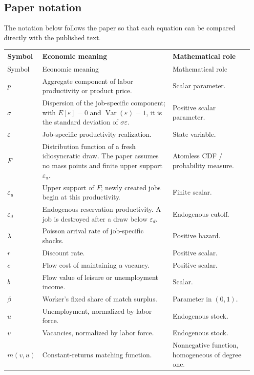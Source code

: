 \documentclass[11pt]{article}
\newcommand{\epsd}{\varepsilon_d}
\newcommand{\epsu}{\varepsilon_u}
\begin{document}
\subsection{Paper notation}
The notation below follows the paper so that each equation can be compared directly with the published text.

\begin{longtable}{>{\raggedright\arraybackslash}p{} >{\raggedright\arraybackslash}p{} >{\raggedright\arraybackslash}p{}}
\toprule
Symbol & Economic meaning & Mathematical role \\
\midrule
\endfirsthead
\toprule
Symbol & Economic meaning & Mathematical role \\
\midrule
\endhead
$p$ & Aggregate component of labor productivity or product price. & Scalar parameter. \\
$\sigma$ & Dispersion of the job-specific component; with $E[\varepsilon]=0$ and $\operatorname{Var}(\varepsilon)=1$, it is the standard deviation of $\sigma\varepsilon$. & Positive scalar parameter. \\
$\varepsilon$ & Job-specific productivity realization. & State variable. \\
$F$ & Distribution function of a fresh idiosyncratic draw. The paper assumes no mass points and finite upper support $\epsu$. & Atomless CDF / probability measure. \\
$\epsu$ & Upper support of $F$; newly created jobs begin at this productivity. & Finite scalar. \\
$\epsd$ & Endogenous reservation productivity. A job is destroyed after a draw below $\epsd$. & Endogenous cutoff. \\
$\lambda$ & Poisson arrival rate of job-specific shocks. & Positive hazard. \\
$r$ & Discount rate. & Positive scalar. \\
$c$ & Flow cost of maintaining a vacancy. & Positive scalar. \\
$b$ & Flow value of leisure or unemployment income. & Scalar. \\
$\beta$ & Worker's fixed share of match surplus. & Parameter in $(0,1)$. \\
$u$ & Unemployment, normalized by labor force. & Endogenous stock. \\
$v$ & Vacancies, normalized by labor force. & Endogenous stock. \\
$m(v,u)$ & Constant-returns matching function. & Nonnegative function, homogeneous of degree one. \\

\end{longtable}
\end{document}
